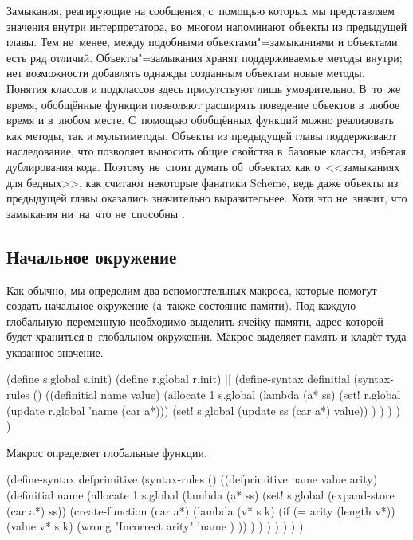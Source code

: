 Замыкания, реагирующие на сообщения, с~помощью которых мы представляем значения
внутри интерпретатора, во~многом напоминают объекты из предыдущей главы. Тем
не~менее, между подобными объектами"=замыканиями и объектами {\Meroonet} есть
ряд отличий. Объекты"=замыкания хранят поддерживаемые методы внутри; нет
возможности добавлять однажды созданным объектам новые методы. Понятия классов
и подклассов здесь присутствуют лишь умозрительно. В~то~же время, обобщённые
функции позволяют расширять поведение объектов в~любое время и в~любом месте.
С~помощью обобщённых функций можно реализовать как методы, так и мультиметоды.
Объекты из предыдущей главы поддерживают наследование, что позволяет выносить
общие свойства в~базовые классы, избегая дублирования кода. Поэтому не~стоит
думать об~объектах как о~<<замыканиях для бедных>>, как считают некоторые
фанатики Scheme, ведь даже объекты из предыдущей главы оказались значительно
выразительнее. Хотя это не~значит, что замыкания ни~на~что не~способны
\cite{ar88}.


\subsection{Начальное окружение}\label{assignment/implementation/ssect:init-env}

Как обычно, мы определим два вспомогательных макроса, которые помогут создать
начальное окружение (а~также состояние памяти). Под каждую глобальную переменную
необходимо выделить ячейку памяти, адрес которой будет храниться в~глобальном
окружении. Макрос  выделяет память и кладёт туда указанное
значение.

\begin{code:lisp}
(define s.global s.init)
(define r.global r.init)
||
(define-syntax definitial
  (syntax-rules ()
   ((definitial name value)
    (allocate 1 s.global
     (lambda (a* ss)
       (set! r.global (update r.global 'name (car a*)))
       (set! s.global (update ss (car a*) value)) ) ) ) ) )
\end{code:lisp}

\noindent
Макрос  определяет глобальные функции.

\begin{code:lisp}
(define-syntax defprimitive
  (syntax-rules ()
   ((defprimitive name value arity)
    (definitial name
     (allocate 1
      s.global
      (lambda (a* ss)
        (set! s.global (expand-store (car a*) ss))
        (create-function (car a*)
         (lambda (v* s k)
           (if (= arity (length v*))
               (value v* s k)
               (wrong "Incorrect arity" 'name ) )) ) ) ) ) ) ) )
\end{code:lisp}

